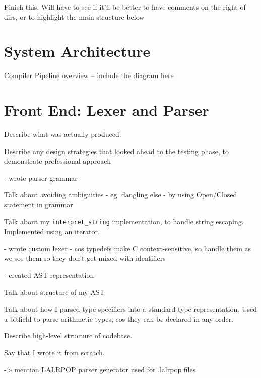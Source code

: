 \documentclass[00-main.tex]{subfiles}
\begin{document}
\begin{Comment}
Finish this. Will have to see if it'll be better to have comments on the right of dirs, or to highlight the main structure below
\end{Comment}

\section{System Architecture}

\begin{Comment}
Compiler Pipeline overview -- include the diagram here
\end{Comment}

\section{Front End: Lexer and Parser}

\begin{Comment}
Describe what was actually produced.

Describe any design strategies that looked ahead to the testing phase, to demonstrate professional approach

\end{Comment}

\begin{Comment}
- wrote parser grammar

Talk about avoiding ambiguities - eg. dangling else - by using Open/Closed statement in grammar

Talk about my \texttt{interpret\_string} implementation, to handle string escaping. Implemented using an iterator.

- wrote custom lexer - cos typedefs make C context-sensitive, so handle them as we see them so they don't get mixed with identifiers

- created AST representation

Talk about structure of my AST

Talk about how I parsed type specifiers into a standard type representation. Used a bitfield to parse arithmetic types, cos they can be declared in any order.
\end{Comment}

\begin{Comment}
Describe high-level structure of codebase.

Say that I wrote it from scratch.

-> mention LALRPOP parser generator used for .lalrpop files
\end{Comment}
\end{document}
